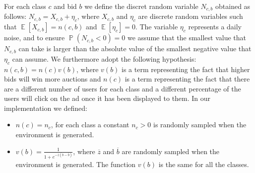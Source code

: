 \documentclass[11pt]{article} %
\DeclareMathOperator{\EX}{\mathbb{E}}
\DeclareMathOperator{\Prob}{\mathbb{P}}
\begin{document}
For each class $c$ and bid $b$ we define the discret random variable $N_{c,b}$ obtained as follows: $N_{c,b} = X_{c,b} + \eta_c$, where $X_{c,b}$ and $\eta_c$ are discrete random variables such that $\EX[X_{c,b}]=n(c,b)$ and $\EX[\eta_c]=0$. The variable $\eta_c$ represents a daily noise, and to ensure $\Prob(N_{c,b} < 0) = 0$ we assume that the smallest value that $N_{c,b}$ can take is larger than the absolute value of the smallest negative value that $\eta_c$ can assume.
\newline
\newline
We furthermore adopt the following hypothesis: $n(c,b)=n(c)v(b)$, where $v(b)$ is a term representing the fact that higher bids will win more auctions and $n(c)$ is a term representing the fact that there are a different number of users for each class and a different percentage of the users will click on the ad once it has been displayed to them.
\newline
\newline
In our implementation we defined:
\begin{itemize}
\item $n(c)=n_c$, for each class a constant $n_c > 0$ is randomly sampled when the environment is generated.
\item $v(b)=\frac{1}{1+e^{-\overline z(b-\overline b)}}$, where $\overline z$ and $\overline b$ are randomly sampled when the environment is generated. The function $v(b)$ is the same for all the classes.
\end{itemize}
\end{document}
